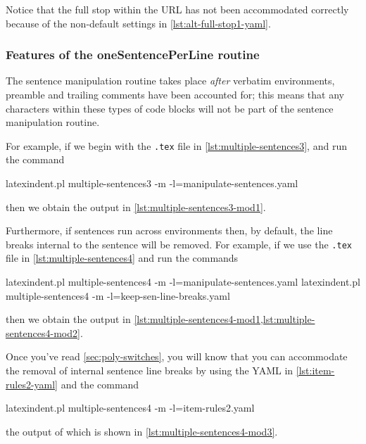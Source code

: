 	Notice that the full stop within the URL has not been accommodated correctly because of
	the non-default settings in \cref{lst:alt-full-stop1-yaml}.

\subsubsection{Features of the oneSentencePerLine routine}
	The sentence manipulation routine takes place \emph{after} verbatim
	environments, preamble and trailing comments have been accounted for; this means that any
	characters within these types of code blocks will not be part of the sentence
	manipulation routine.

	For example, if we begin with the \texttt{.tex} file in
	\cref{lst:multiple-sentences3}, and run the command
	\begin{commandshell}
latexindent.pl multiple-sentences3 -m -l=manipulate-sentences.yaml
\end{commandshell}
	then we obtain the output in \cref{lst:multiple-sentences3-mod1}. 

	Furthermore, if sentences run across environments then, by default, the line breaks
	internal to the sentence will be removed. For example, if we use the
	\texttt{.tex} file in \cref{lst:multiple-sentences4} and run the commands
	\begin{commandshell}
latexindent.pl multiple-sentences4 -m -l=manipulate-sentences.yaml
latexindent.pl multiple-sentences4 -m -l=keep-sen-line-breaks.yaml
\end{commandshell}
	then we obtain the output in \cref{lst:multiple-sentences4-mod1,lst:multiple-sentences4-mod2}. 
	\begin{widepage}
	\end{widepage}
	Once you've read \cref{sec:poly-switches}, you will know that you can accommodate the
	removal of internal sentence line breaks by using the YAML in \cref{lst:item-rules2-yaml}
	and the command
	\begin{commandshell}
latexindent.pl multiple-sentences4 -m -l=item-rules2.yaml
\end{commandshell}
	the output of which is shown in \cref{lst:multiple-sentences4-mod3}.

